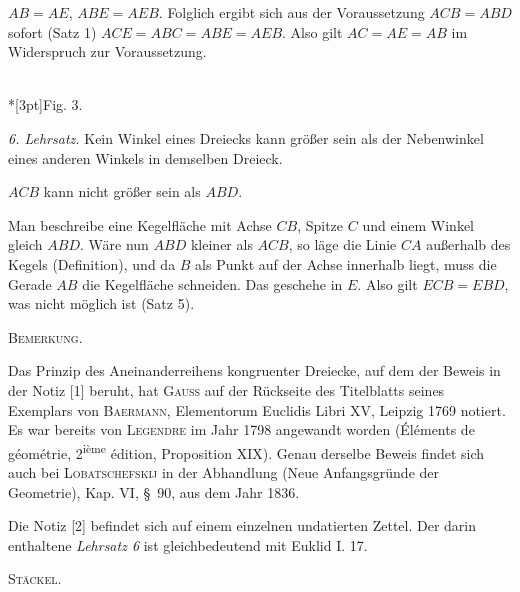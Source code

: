 $AB = AE$, $ABE = AEB$. Folglich ergibt sich aus der Voraussetzung $ACB = ABD$ sofort
(Satz 1) $ACE = ABC = ABE = AEB$. Also gilt $AC = AE = AB$ im Widerspruch zur Voraussetzung.

\begin{center}
\\*[3pt]Fig. 3.
\end{center}

\emph{6. Lehrsatz.} Kein Winkel eines Dreiecks kann größer sein als der Nebenwinkel
eines anderen Winkels in demselben Dreieck.

$ACB$ kann nicht größer sein als $ABD$.

 Man beschreibe eine Kegelfläche mit Achse $CB$, Spitze $C$ und einem Winkel gleich $ABD$.
Wäre nun $ABD$ kleiner als $ACB$, so läge die Linie $CA$ außerhalb des
Kegels (Definition), und da $B$ als Punkt auf der Achse innerhalb liegt,
muss die Gerade $AB$ die Kegelfläche schneiden. Das geschehe in $E$. Also gilt
$ECB = EBD$, was nicht möglich ist (Satz 5).


 

\begin{center}

\end{center}

\begin{center}\textsc{Bemerkung.}\end{center}


Das Prinzip des Aneinanderreihens kongruenter Dreiecke, auf dem der Beweis in der
Notiz [1] beruht, hat \textsc{Gauss} auf der Rückseite des Titelblatts seines Exemplars
von \textsc{Baermann}, Elementorum Euclidis Libri XV, Leipzig 1769 notiert. Es war bereits
von \textsc{Legendre} im Jahr 1798 angewandt worden (Éléments de géométrie, 2\textsuperscript{ième} édition,
Proposition XIX). Genau derselbe Beweis findet sich auch bei \textsc{Lobatschefskij} in der
Abhandlung  (Neue Anfangsgründe der Geometrie), Kap. VI,
\S\ 90, aus dem Jahr 1836.

Die Notiz [2] befindet sich auf einem einzelnen undatierten Zettel. Der darin
enthaltene \emph{Lehrsatz 6} ist gleichbedeutend mit Euklid I. 17.

\begin{flushright}\textsc{Stäckel.}\end{flushright}

